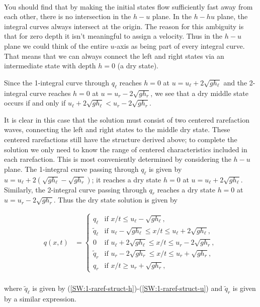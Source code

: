 \documentclass{SIAMbook2016}
\begin{document}
    \begin{center}
    \end{center}
    { \hspace*{\fill} \\}
    
You should find that by making the initial states flow sufficiently fast
away from each other, there is no intersection in the \(h-u\) plane. In
the \(h-hu\) plane, the integral curves always intersect at the origin.
The reason for this ambiguity is that for zero depth it isn't meaningful
to assign a velocity. Thus in the \(h-u\) plane we could think of the
entire \(u\)-axis as being part of every integral curve. That means that
we can always connect the left and right states via an intermediate
state with depth \(h=0\) (a dry state).

Since the 1-integral curve through \(q_\ell\) reaches \(h=0\) at
\(u = u_\ell + 2 \sqrt{gh_\ell}\) and the 2-integral curve reaches
\(h=0\) at \(u=u_r-2\sqrt{gh_r}\), we see that a dry middle state occurs
if and only if \(u_\ell + 2 \sqrt{gh_\ell} < u_r-2\sqrt{gh_r}\).

It is clear in this case that the solution must consist of two centered
rarefaction waves, connecting the left and right states to the middle
dry state. These centered rarefactions still have the structure derived
above; to complete the solution we only need to know the range of
centered characteristics included in each rarefaction. This is most
conveniently determined by considering the \(h-u\) plane. The 1-integral
curve passing through \(q_\ell\) is given by
\(u = u_\ell + 2(\sqrt{gh_\ell}-\sqrt{gh_r})\); it reaches a dry state
\(h=0\) at \(u=u_\ell + 2\sqrt{gh_\ell}\). Similarly, the 2-integral
curve passing through \(q_r\) reaches a dry state \(h=0\) at
\(u=u_r - 2\sqrt{gh_r}\). Thus the dry state solution is given by

\begin{align}
    q(x,t) & = \begin{cases} 
                        q_\ell &         \text{if } x/t \le u_\ell - \sqrt{gh_\ell}, \\
                        \tilde{q}_\ell & \text{if } u_\ell -  \sqrt{gh_\ell} \le x/t \le u_\ell+2\sqrt{gh_\ell}, \\
                        0 &           \text{if } u_\ell + 2\sqrt{gh_\ell} \le x/t \le u_r - 2\sqrt{gh_r}, \\
                        \tilde{q}_r & \text{if } u_r - 2\sqrt{gh_r} \le x/t \le u_r+\sqrt{gh_r}, \\
                        q_r &         \text{if } x/t \ge u_r + \sqrt{gh_r},
                       \end{cases}
\end{align}\\
where \(\tilde{q}_\ell\) is given by
(\ref{SW:1-raref-struct-h})-(\ref{SW:1-raref-struct-u}) and
\(\tilde{q}_r\) is given by a similar expression.
\end{document}
